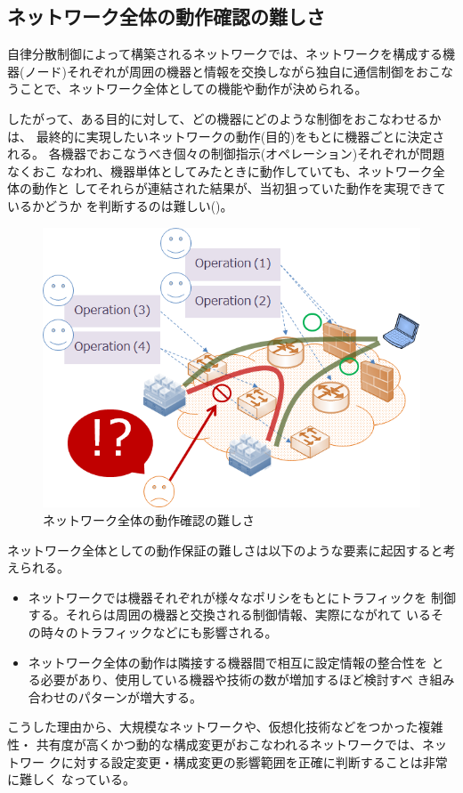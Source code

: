   \subsection{ネットワーク全体の動作確認の難しさ}

自律分散制御によって構築されるネットワークでは、ネットワークを構成する機
器(ノード)それぞれが周囲の機器と情報を交換しながら独自に通信制御をおこな
うことで、ネットワーク全体としての機能や動作が決められる。

したがって、ある目的に対して、どの機器にどのような制御をおこなわせるかは、
最終的に実現したいネットワークの動作(目的)をもとに機器ごとに決定される。
各機器でおこなうべき個々の制御指示(オペレーション)それぞれが問題なくおこ
なわれ、機器単体としてみたときに動作していても、ネットワーク全体の動作と
してそれらが連結された結果が、当初狙っていた動作を実現できているかどうか
を判断するのは難しい()。

 \begin{figure}[h]
  \centering
  \includegraphics[scale=0.5]{img/difficulty-of-network-operation.png}
  \caption{ネットワーク全体の動作確認の難しさ}
  \label{fig:difficulty-of-network-operation}
 \end{figure}

ネットワーク全体としての動作保証の難しさは以下のような要素に起因すると考
えられる。
\begin{itemize}
 \item ネットワークでは機器それぞれが様々なポリシをもとにトラフィックを
       制御する。それらは周囲の機器と交換される制御情報、実際にながれて
       いるその時々のトラフィックなどにも影響される。
 \item ネットワーク全体の動作は隣接する機器間で相互に設定情報の整合性を
       とる必要があり、使用している機器や技術の数が増加するほど検討すべ
       き組み合わせのパターンが増大する。
\end{itemize}
こうした理由から、大規模なネットワークや、仮想化技術などをつかった複雑性・
共有度が高くかつ動的な構成変更がおこなわれるネットワークでは、ネットワー
クに対する設定変更・構成変更の影響範囲を正確に判断することは非常に難しく
なっている。

